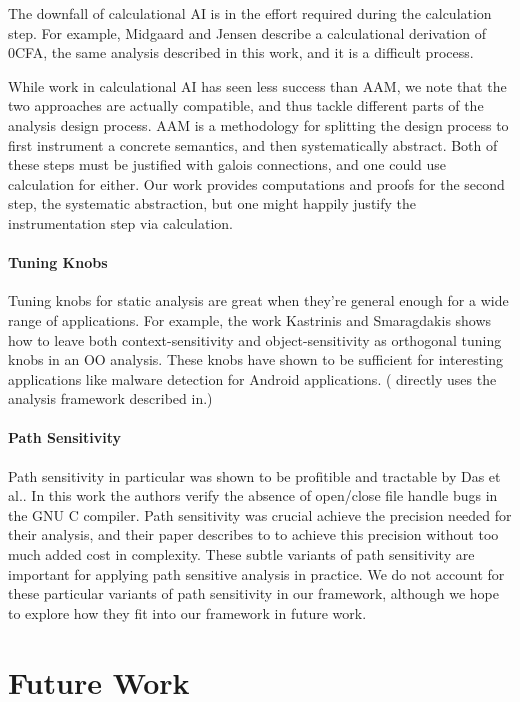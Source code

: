 \documentclass{article}
\begin{document}
The downfall of calculational AI is in the effort required during the calculation step.
For example, Midgaard and Jensen\cite{Calculational0CFA} describe a calculational derivation of 0CFA, the same analysis described in this work, and it is a difficult process.

While work in calculational AI has seen less success than AAM, we note that the two approaches are actually compatible, and thus tackle different parts of the analysis design process.
AAM is a methodology for splitting the design process to first instrument a concrete semantics, and then systematically abstract.
Both of these steps must be justified with galois connections, and one could use calculation for either.
Our work provides computations and proofs for the second step, the systematic abstraction, but one might happily justify the instrumentation step via calculation.

\paragraph{Tuning Knobs}
Tuning knobs for static analysis are great when they're general enough for a wide range of applications.
For example, the work Kastrinis and Smaragdakis\cite{HybridContextObject} shows how to leave both context-sensitivity and object-sensitivity as orthogonal tuning knobs in an OO analysis.
These knobs have shown to be sufficient for interesting applications like malware detection for Android applications\cite{Apposcopy}.
(\cite{Apposcopy} directly uses the analysis framework described in\cite{HybridContextObject}.)

\paragraph{Path Sensitivity}
Path sensitivity in particular was shown to be profitible and tractable by Das et al.\cite{ESP}.
In this work the authors verify the absence of open/close file handle bugs in the GNU C compiler.
Path sensitivity was crucial achieve the precision needed for their analysis, and their paper describes to to achieve this precision without too much added cost in complexity.
These subtle variants of path sensitivity are important for applying path sensitive analysis in practice.
We do not account for these particular variants of path sensitivity in our framework, although we hope to explore how they fit into our framework in future work.

\section{Future Work}
\label{FutureWork}
\end{document}
